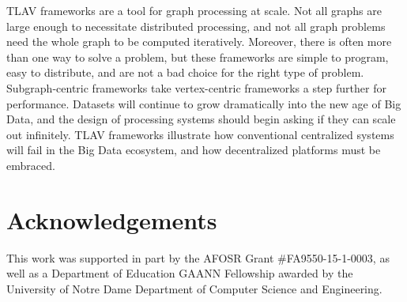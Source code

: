 \documentclass[reprint,twocolumn,showpacs,preprintnumbers,amsmath, aps,pre,amssymb]{revtex4-1}
\begin{document}
TLAV frameworks are a tool for graph processing at scale.  Not all graphs are large enough to necessitate distributed processing, and not all graph problems need the whole graph to be computed iteratively.  Moreover, there is often more than one way to solve a problem, but these frameworks are simple to program, easy to distribute, and are not a bad choice for the right type of problem.  Subgraph-centric frameworks take vertex-centric frameworks a step further for performance.  Datasets will continue to grow dramatically into the new age of Big Data, and the design of processing systems should begin asking if they can scale out infinitely.  TLAV frameworks illustrate how conventional centralized systems will fail in the Big Data ecosystem, and how decentralized platforms must be embraced.

\section{Acknowledgements}
This work was supported in part by the AFOSR Grant \#FA9550-15-1-0003, as well as a Department of Education GAANN Fellowship awarded by the University of Notre Dame Department of Computer Science and Engineering.
\end{document}
